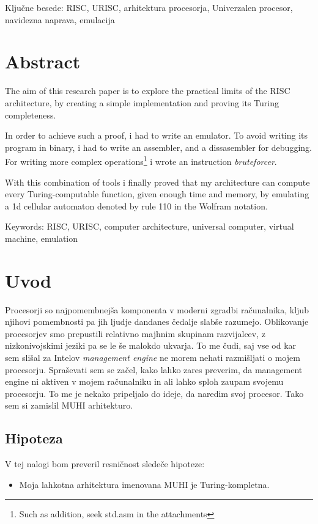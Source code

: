 \documentclass[12pt]{article}
\begin{document}
Ključne besede: RISC, URISC, arhitektura procesorja, Univerzalen procesor, navidezna naprava, emulacija

\section{Abstract}
The aim of this research paper is to explore the practical limits of the RISC architecture, by creating a simple implementation and proving its Turing completeness.

In order to achieve such a proof, i had to write an emulator.
To avoid writing its program in binary, i had to write an assembler, and a dissasembler for debugging.
For writing more complex operations\footnote{Such as addition, seek std.asm in the attachments} i wrote an instruction \textit{bruteforcer}.

With this combination of tools i finally proved that my architecture can compute every Turing-computable function, given enough time and memory, by emulating a 1d cellular automaton denoted by rule 110 in the Wolfram notation.

Keywords: RISC, URISC, computer architecture, universal computer, virtual machine, emulation

\pagebreak

\section{Uvod}
Procesorji so najpomembnejša komponenta v moderni zgradbi računalnika, kljub njihovi pomembnosti pa jih ljudje dandanes čedalje slabše razumejo.
Oblikovanje procesorjev smo prepustili relativno majhnim skupinam razvijalcev, z nizkonivojskimi jeziki pa se le še malokdo ukvarja.
To me čudi, saj vse od kar sem slišal za Intelov \textit{management engine} ne morem nehati razmišljati o mojem procesorju.
Spraševati sem se začel, kako lahko zares preverim, da management engine ni aktiven v mojem računalniku in ali lahko sploh zaupam svojemu procesorju.
To me je nekako pripeljalo do ideje, da naredim svoj procesor.
Tako sem si zamislil MUHI arhitekturo.

\subsection{Hipoteza}
V tej nalogi bom preveril resničnost sledeče hipoteze:
\begin{itemize}
  \item Moja lahkotna arhitektura imenovana MUHI je Turing-kompletna.
\end{itemize}
\end{document}
